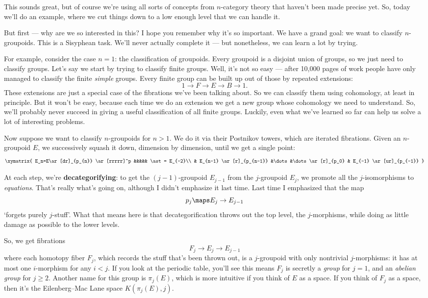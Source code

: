 \documentclass{amsart}
\begin{document}
This sounds great, but of course we're using all sorts of concepts
from $n$-category theory that haven't been made precise yet.  So, 
today we'll do an example, where we cut things down to a low enough 
level that we can handle it.

But first --- why are we so interested in this?  I hope you remember
why it's so important.  We have a grand goal: we want to classify
$n$-groupoids.   This is a Sisyphean task.  We'll never
actually complete it --- but nonetheless, we can learn a lot by trying.

For example, consider the case $n = 1$: the classification of groupoids.  
Every groupoid is a disjoint union of groups, so we just need to 
classify groups.  Let's say we start by trying to classify finite
groups.  Well, it's not so easy --- after 10,000 pages of work people
have only managed to classify the finite \emph{simple} groups.
Every finite group can be built up out of those by repeated extensions:
\[ 1\to F\to E\to B \to 1.  \]
These extensions are just a special case of the fibrations we've been talking
about.   So we can classify them using cohomology, at least in principle.  
But it won't be easy, because each time we do an extension we get a 
new group whose cohomology we need to understand.  So, we'll
probably never succeed in giving a useful classification of all
finite groups.  Luckily, even what we've learned so far can help us 
solve a lot of interesting problems. 

Now suppose we want to classify $n$-groupoids for $n > 1$.  
We do it via their Postnikov towers, which are iterated 
fibrations.  Given an $n$-groupoid $E$, we successively 
squash it down, dimension by dimension, until we get a single point: 
\[\xymatrix{
  E_n=E\ar[dr]_{p_{n}} \ar[rrrrr]^p &&&&& \ast = E_{-2}\\
  & E_{n-1} \ar[r]_{p_{n-1}} &\dots&\dots \ar[r]_{p_0} & E_{-1} 
  \ar[ur]_{p_{-1}}
}\]

\noindent
At each step, we're \textbf{decategorifying}: to get the $(j-1)$-groupoid 
$E_{j-1}$ from the $j$-groupoid $E_j$, we promote all the 
$j$-isomorphisms to \emph{equations}.  That's really what's going on, 
although I didn't emphasize it last time.  Last time I emphasized 
that the map 
\[     p_j \maps E_j \to E_{j-1}   \]
`forgets purely $j$-stuff'.  What that means here is that decategorification
throws out the top level, the $j$-morphisms, while doing as little 
damage as possible to the lower levels.  

So, we get fibrations
\[         F_j \to E_j \to E_{j-1}  \]
where each homotopy fiber $F_j$, which records the stuff that's been 
thrown out, is a $j$-groupoid with only nontrivial $j$-morphisms: it 
has at most one $i$-morphism for any $i < j$.  
If you look at the periodic table, you'll see this means $F_j$ is
secretly a \emph{group} for $j = 1$, and an \emph{abelian group} for 
$j \ge 2$.  Another name for this group is $\pi_j(E)$, which is
more intuitive if you think of $E$ as a space.  If you think of 
$F_j$ as a space, then it's the Eilenberg--Mac Lane space 
$K(\pi_j(E), j)$.
\end{document}
